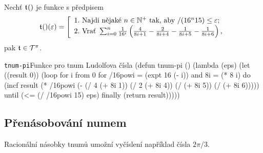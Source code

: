 \begin{consequence}
Nechť $\mathfrak{t}^{}()$ je funkce s předpisem 
\begin{equation}
\mathfrak{t}^{}()(\varepsilon)=\left[\begin{array}{l}
\mathrm{1.~}\text{Najdi~nějaké~}n\in\mathbb{N}^+\text{~tak,~aby~}/(16^n15)\leq\varepsilon;\\
\mathrm{2.~}\text{Vrať~}\sum_{i=0}^n\frac{1}{16^i}\left(\frac{4}{8i+1}-\frac{2}{8i+4}-\frac{1}{8i+5}-\frac{1}{8i+6}\right),
\end{array}\right.
\end{equation} pak $\mathfrak{t}^{}\in\mathcal{T}^{\pi}$.
\end{consequence}
\begin{lispcode}{\texttt{tnum-pi}}{Funkce pro tnum Ludolfova čísla}
(\textcolor{funkcionalni}{defun} \textcolor{pojmenovan}{tnum-pi} ()
  (\textcolor{funkcionalni}{lambda} (eps)
    (\textcolor{vedlejsi}{let} ((result 0))
      (\textcolor{funkcionalni}{loop} \textcolor{obarvi}{for} i \textcolor{obarvi}{from} 0
            \textcolor{obarvi}{for} /16powi = (\textcolor{matematicke}{expt} 16 (\textcolor{matematicke}{-} i)) \textcolor{obarvi}{and} 8i = (\textcolor{matematicke}{*} 8 i)
            \textcolor{obarvi}{do} (\textcolor{vedlejsi}{incf} result 
                     (\textcolor{matematicke}{*} /16powi
                        (\textcolor{matematicke}{-} (\textcolor{matematicke}{/} 4 (\textcolor{matematicke}{+} 8i 1))
                           (\textcolor{matematicke}{/} 2 (\textcolor{matematicke}{+} 8i 4))
                           (\textcolor{matematicke}{/} (\textcolor{matematicke}{+} 8i 5))
                           (\textcolor{matematicke}{/} (\textcolor{matematicke}{+} 8i 6)))))
            \textcolor{obarvi}{until} (\textcolor{matematicke}{<=} (\textcolor{matematicke}{/} /16powi 15) eps)
            \textcolor{obarvi}{finally} (\textcolor{funkcionalni}{return} result)))))
\end{lispcode}

\subsection{Přenásobování numem}

Racionální násobky tnumů umožní vyčíslení například čísla $2\pi{/3}$.

